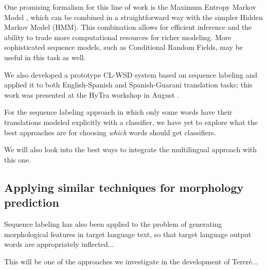 One promising formalism for this line of work is the Maximum Entropy Markov
Model \cite{icml00/mccallum}, which can be combined in a straightforward way
with the simpler Hidden Markov Model (HMM).
This combination allows for efficient inference and the ability to trade more
computational resources for richer modeling. More sophisticated sequence
models, such as Conditional Random Fields, may be useful in this task as well.

We also developed a prototype CL-WSD system based on sequence labeling and
applied it to both English-Spanish and Spanish-Guarani translation tasks; this
work was presented at the HyTra workshop in August
\cite{rudnick-gasser:2013:HyTra-2013}.

For the sequence labeling approach in which only some words have their
translations modeled explicitly with a classifier, we have yet to explore what
the best approaches are for choosing \emph{which} words should get classifiers.

We will also look into the best ways to integrate the multilingual approach
with this one.

\subsection{Applying similar techniques for morphology prediction}

Sequence labeling has also been applied to the problem of generating
morphological features in target language text, so that target language output
words are appropriately inflected...
\cite{toutanova-suzuki-ruopp:2008:ACLMain}

This will be one of the approaches we investigate in the development of
Tereré...

